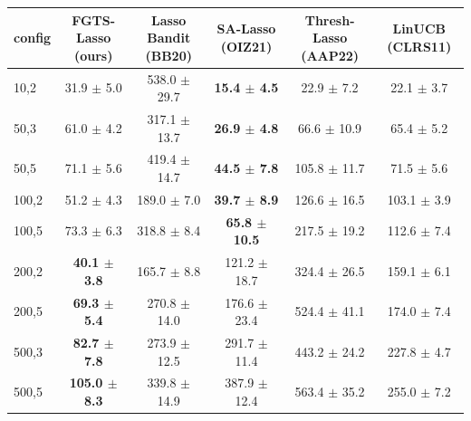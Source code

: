 \begin{tabular}{lccccc}
\toprule
config & FGTS-Lasso {(ours)} & Lasso Bandit {(BB20)} & SA-Lasso {(OIZ21)} & Thresh-Lasso {(AAP22)} & LinUCB {(CLRS11)} \\
\midrule
10,2 & 31.9 $\pm$ 5.0 & 538.0 $\pm$ 29.7 & \textbf{15.4 $\pm$ 4.5} & 22.9 $\pm$ 7.2 & 22.1 $\pm$ 3.7 \\
50,3 & 61.0 $\pm$ 4.2 & 317.1 $\pm$ 13.7 & \textbf{26.9 $\pm$ 4.8} & 66.6 $\pm$ 10.9 & 65.4 $\pm$ 5.2 \\
50,5 & 71.1 $\pm$ 5.6 & 419.4 $\pm$ 14.7 & \textbf{44.5 $\pm$ 7.8} & 105.8 $\pm$ 11.7 & 71.5 $\pm$ 5.6 \\
100,2 & 51.2 $\pm$ 4.3 & 189.0 $\pm$ 7.0 & \textbf{39.7 $\pm$ 8.9} & 126.6 $\pm$ 16.5 & 103.1 $\pm$ 3.9 \\
100,5 & 73.3 $\pm$ 6.3 & 318.8 $\pm$ 8.4 & \textbf{65.8 $\pm$ 10.5} & 217.5 $\pm$ 19.2 & 112.6 $\pm$ 7.4 \\
200,2 & \textbf{40.1 $\pm$ 3.8} & 165.7 $\pm$ 8.8 & 121.2 $\pm$ 18.7 & 324.4 $\pm$ 26.5 & 159.1 $\pm$ 6.1 \\
200,5 & \textbf{69.3 $\pm$ 5.4} & 270.8 $\pm$ 14.0 & 176.6 $\pm$ 23.4 & 524.4 $\pm$ 41.1 & 174.0 $\pm$ 7.4 \\
500,3 & \textbf{82.7 $\pm$ 7.8} & 273.9 $\pm$ 12.5 & 291.7 $\pm$ 11.4 & 443.2 $\pm$ 24.2 & 227.8 $\pm$ 4.7 \\
500,5 & \textbf{105.0 $\pm$ 8.3} & 339.8 $\pm$ 14.9 & 387.9 $\pm$ 12.4 & 563.4 $\pm$ 35.2 & 255.0 $\pm$ 7.2 \\
\bottomrule
\end{tabular}
